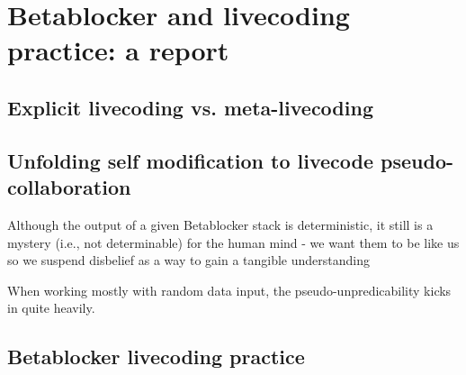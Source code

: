 \documentclass[letterpaper, 12pt]{article}
\begin{document}


\section{Betablocker and livecoding practice: a report} 
\label{sec:betablocker_and_livecoding_practice_a_report}

\subsection{Explicit livecoding vs. meta-livecoding} 
\label{sub:explicit_livecoding_}



\subsection{Unfolding self modification to livecode pseudo-collaboration} 
\label{sec:unfolding_self_modification_to_livecode_collaboration}

Although the output of a given Betablocker stack is deterministic, it still is a mystery (i.e., not determinable) for the human mind - we want them to be like us so we suspend disbelief as a way to gain a tangible understanding

When working mostly with random data input, the pseudo-unpredicability kicks in quite heavily. 



\subsection{Betablocker livecoding practice}
\label{sub:livecoding_performance_practice_influenced_by_betablocker}

% 
% 
\end{document}
